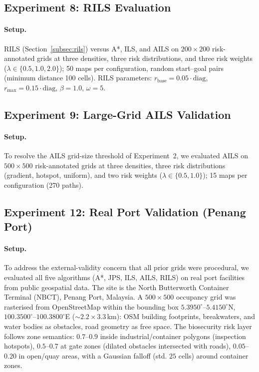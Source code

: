 \documentclass[preprint,12pt,authoryear]{elsarticle}
\begin{document}
\subsection{Experiment 8: RILS Evaluation}

\paragraph{Setup.}
RILS (Section~\ref{subsec:rils}) versus A*, ILS, and AILS on $200 \times 200$ risk-annotated grids at three densities, three risk distributions, and three risk weights ($\lambda \in \{0.5, 1.0, 2.0\}$); 50 maps per configuration, random start--goal pairs (minimum distance 100 cells). RILS parameters: $r_{\text{base}} = 0.05 \cdot \text{diag}$, $r_{\max} = 0.15 \cdot \text{diag}$, $\beta = 1.0$, $\omega = 5$.

\subsection{Experiment 9: Large-Grid AILS Validation}

\paragraph{Setup.}
To resolve the AILS grid-size threshold of Experiment~2, we evaluated AILS on $500 \times 500$ risk-annotated grids at three densities, three risk distributions (gradient, hotspot, uniform), and two risk weights ($\lambda \in \{0.5, 1.0\}$); 15 maps per configuration (270 paths).

\subsection{Experiment 12: Real Port Validation (Penang Port)}\label{subsec:exp12_setup}

\paragraph{Setup.}
To address the external-validity concern that all prior grids were procedural, we evaluated all five algorithms (A*, JPS, ILS, AILS, RILS) on real port facilities from public geospatial data. The site is the North Butterworth Container Terminal (NBCT), Penang Port, Malaysia. A $500 \times 500$ occupancy grid was rasterised from OpenStreetMap within the bounding box $5.3950^\circ$--$5.4150^\circ$N, $100.3500^\circ$--$100.3800^\circ$E (${\sim}2.2 \times 3.3$\,km): OSM building footprints, breakwaters, and water bodies as obstacles, road geometry as free space. The biosecurity risk layer follows zone semantics: $0.7$--$0.9$ inside industrial/container polygons (inspection hotspots), $0.5$--$0.7$ at gate zones (dilated obstacles intersected with roads), $0.05$--$0.20$ in open/quay areas, with a Gaussian falloff (std. $25$ cells) around container zones.
\end{document}
